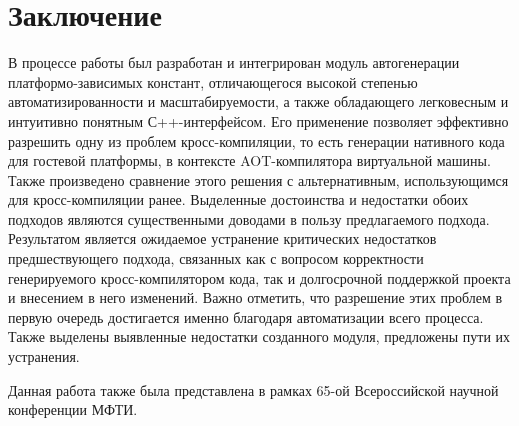 \chapter{Заключение}
\label{sec:Chapter5} 
В процессе работы был разработан и интегрирован модуль автогенерации платформо-зависимых констант, отличающегося высокой степенью автоматизированности и масштабируемости, а также обладающего легковесным и интуитивно понятным С++-интерфейсом.
Его применение позволяет эффективно разрешить одну из проблем кросс-компиляции, то есть генерации нативного кода для гостевой платформы, в контексте AOT-компилятора виртуальной машины.
Также произведено сравнение этого решения с альтернативным, использующимся для кросс-компиляции ранее.
Выделенные достоинства и недостатки обоих подходов являются существенными доводами в пользу предлагаемого подхода.
Результатом является ожидаемое устранение критических недостатков предшествующего подхода, связанных как с вопросом корректности генерируемого кросс-компилятором кода, так и долгосрочной поддержкой проекта и внесением в него изменений.
Важно отметить, что разрешение этих проблем в первую очередь достигается именно благодаря автоматизации всего процесса.
Также выделены выявленные недостатки созданного модуля, предложены пути их устранения.  
\par
Данная работа также была представлена в рамках 65-ой Всероссийской научной конференции МФТИ.
\newpage